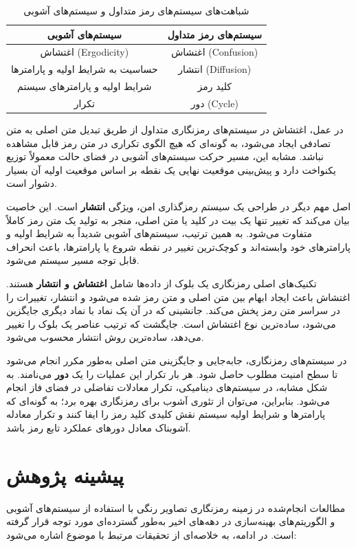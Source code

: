 \documentclass[a4paper,12pt]{report}
\renewcommand{\%}{\lr{\oldpercent}}
\providecommand{\lr}[1]{#1}
\begin{document}
\begin{table}[h]
\centering
\caption{شباهت‌های سیستم‌های رمز متداول و سیستم‌های آشوبی} \label{tab:chaos_comparison}
\begin{tabular}{|c|c|}
\hline
\textbf{سیستم‌های آشوبی} & \textbf{سیستم‌های رمز متداول} \\ \hline
اغتشاش \lr{(Ergodicity)} & اغتشاش \lr{(Confusion)} \\ \hline
حساسیت به شرایط اولیه و پارامترها & انتشار \lr{(Diffusion)} \\ \hline
شرایط اولیه و پارامترهای سیستم & کلید رمز \\ \hline
تکرار & دور \lr{(Cycle)} \\ \hline
\end{tabular}
\end{table}

در عمل، اغتشاش در سیستم‌های رمزنگاری متداول از طریق تبدیل متن اصلی به متن تصادفی ایجاد می‌شود، به گونه‌ای که هیچ الگوی تکراری در متن رمز قابل مشاهده نباشد. مشابه این، مسیر حرکت سیستم‌های آشوبی در فضای حالت معمولاً توزیع یکنواخت دارد و پیش‌بینی موقعیت نهایی یک نقطه بر اساس موقعیت اولیه آن بسیار دشوار است\cite{ref21}.

اصل مهم دیگر در طراحی یک سیستم رمزگذاری امن، ویژگی \textbf{انتشار} است. این خاصیت بیان می‌کند که تغییر تنها یک بیت در کلید یا متن اصلی، منجر به تولید یک متن رمز کاملاً متفاوت می‌شود. به همین ترتیب، سیستم‌های آشوبی شدیداً به شرایط اولیه و پارامترهای خود وابسته‌اند و کوچک‌ترین تغییر در نقطه شروع یا پارامترها، باعث انحراف قابل توجه مسیر سیستم می‌شود\cite{ref22}.

تکنیک‌های اصلی رمزنگاری یک بلوک از داده‌ها شامل \textbf{اغتشاش و انتشار} هستند. اغتشاش باعث ایجاد ابهام بین متن اصلی و متن رمز شده می‌شود و انتشار، تغییرات را در سراسر متن رمز پخش می‌کند. جانشینی که در آن یک نماد با نماد دیگری جایگزین می‌شود، ساده‌ترین نوع اغتشاش است. جایگشت که ترتیب عناصر یک بلوک را تغییر می‌دهد، ساده‌ترین روش انتشار محسوب می‌شود.

در سیستم‌های رمزنگاری، جابه‌جایی و جایگزینی متن اصلی به‌طور مکرر انجام می‌شود تا سطح امنیت مطلوب حاصل شود. هر بار تکرار این عملیات را یک \textbf{دور} می‌نامند. به شکل مشابه، در سیستم‌های دینامیکی، تکرار معادلات تفاضلی در فضای فاز انجام می‌شود. بنابراین، می‌توان از تئوری آشوب برای رمزنگاری بهره برد؛ به گونه‌ای که پارامترها و شرایط اولیه سیستم نقش کلیدی کلید رمز را ایفا کنند و تکرار معادله آشوبناک معادل دورهای عملکرد تابع رمز باشد\cite{ref23}.

\section{پیشینه پژوهش}
مطالعات انجام‌شده در زمینه رمزنگاری تصاویر رنگی با استفاده از سیستم‌های آشوبی و الگوریتم‌های بهینه‌سازی در دهه‌های اخیر به‌طور گسترده‌ای مورد توجه قرار گرفته است. در ادامه، به خلاصه‌ای از تحقیقات مرتبط با موضوع اشاره می‌شود:
\end{document}
